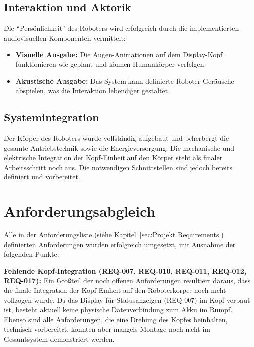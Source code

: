 \subsection{Interaktion und Aktorik}
\label{cha:Interaktion und Aktorik}

Die "`Persönlichkeit"' des Roboters wird erfolgreich durch die implementierten audiovisuellen Komponenten vermittelt:

\begin{itemize}
\item \textbf{Visuelle Ausgabe:} Die Augen-Animationen auf dem Display-Kopf funktionieren wie geplant und können Humankörper verfolgen.
	
	\item \textbf{Akustische Ausgabe:} Das System kann definierte Roboter-Geräusche abspielen, was die Interaktion lebendiger gestaltet.
	
\end{itemize}

\subsection{Systemintegration}
\label{cha:Systemintegration}

Der Körper des Roboters wurde vollständig aufgebaut und beherbergt die gesamte Antriebstechnik sowie die Energieversorgung. Die mechanische und elektrische Integration der Kopf-Einheit auf den Körper steht als finaler Arbeitsschritt noch aus. Die notwendigen Schnittstellen sind jedoch bereits definiert und vorbereitet.

\section{Anforderungsabgleich}
\label{cha:Anforderungsabgleich}

Alle in der Anforderungsliste (siehe Kapitel~\ref{sec:Projekt Requirements}) definierten Anforderungen wurden erfolgreich umgesetzt, mit Ausnahme der folgenden Punkte:

\textbf{Fehlende Kopf-Integration (REQ-007, REQ-010, REQ-011, REQ-012, REQ-017):} Ein Großteil der noch offenen Anforderungen resultiert daraus, dass die finale Integration der Kopf-Einheit auf den Roboterkörper noch nicht vollzogen wurde. Da das Display für Statusanzeigen (REQ-007) im Kopf verbaut ist, besteht aktuell keine physische Datenverbindung zum Akku im Rumpf. Ebenso sind alle Anforderungen, die eine Drehung des Kopfes beinhalten, technisch vorbereitet, konnten aber mangels Montage noch nicht im Gesamtsystem demonstriert werden.

